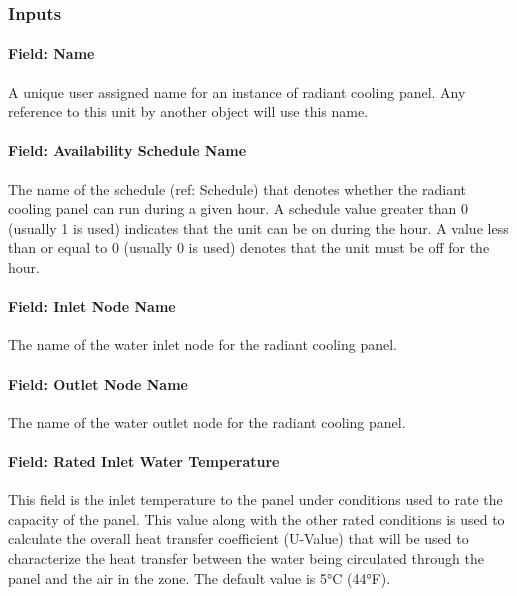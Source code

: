 \subsubsection{Inputs}\label{inputs-3-028-1}

\paragraph{Field: Name}\label{field-name-3-025-1}

A unique user assigned name for an instance of radiant cooling panel. Any reference to this unit by another object will use this name.

\paragraph{Field: Availability Schedule Name}\label{field-availability-schedule-name-3-005-1}

The name of the schedule (ref: Schedule) that denotes whether the radiant cooling panel can run during a given hour. A schedule value greater than 0 (usually 1 is used) indicates that the unit can be on during the hour. A value less than or equal to 0 (usually 0 is used) denotes that the unit must be off for the hour.

\paragraph{Field: Inlet Node Name}\label{field-inlet-node-name-2-002-1}

The name of the water inlet node for the radiant cooling panel.

\paragraph{Field: Outlet Node Name}\label{field-outlet-node-name-2-002-1}

The name of the water outlet node for the radiant cooling panel.

\paragraph{Field: Rated Inlet Water Temperature}\label{field-rated-inlet-water-temperature}

This field is the inlet temperature to the panel under conditions used to rate the capacity of the panel.  This value along with the other rated conditions is used to calculate the overall heat transfer coefficient (U-Value) that will be used to characterize the heat transfer between the water being circulated through the panel and the air in the zone.  The default value is 5°C (44°F).

